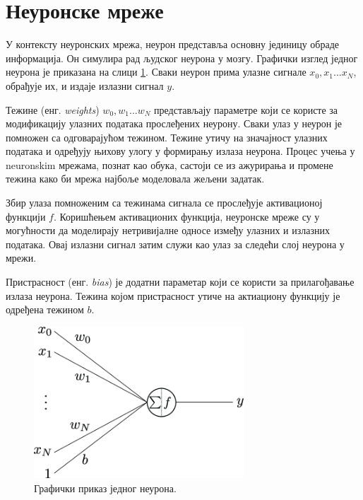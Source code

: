 \documentclass[a4paper, 12pt, master, utf8]{etf}
\begin{document}
\section{Неуронске мреже}
\label{sec:23}

У контексту неуронских мрежа, неурон представља основну јединицу обраде информација. \cite{noauthor_artificial_20233} 
Он симулира рад људског неурона у мозгу. Графички изглед једног неурона је приказана на слици \ref{fig:neuron}. Сваки неурон прима улазне сигнале $x_0, x_1 ... x_N$, обрађује их, и издаје излазни сигнал $y$. 
\newline

Тежине (енг. \textit{weights}) $w_0, w_1 ... w_N$ представљају параметре који се користе за модификацију улазних података прослеђених неурону. Сваки улаз у неурон је помножен са одговарајућом тежином. Тежине утичу на значајност улазних података и одређују њихову улогу у 
формирању излаза неурона. Процес учења у neuronskim мрежама, познат као обука, састоји се из ажурирања и промене тежина како би мрежа најбоље моделовала жељени задатак.
\newline

Збир улаза помноженим са тежинама сигнала се прослеђује активационој функцији $f$. 
Коришћењем активационих функција, неуронске мреже су у могућности да моделирају нетривијалне односе између улазних и излазних података. Овај излазни сигнал затим служи као улаз за следећи слој неурона у мрежи.
\newline

Пристрасност (енг. \textit{bias}) је додатни параметар који се користи за прилагођавање излаза неурона. Тежина којом пристрасност утиче на актиациону функцију је одређена тежином $b$.
\newline

\begin{figure}[h]
    \centering
    \includegraphics[width=0.7\textwidth]{images/neuron.png}
    \caption{Графички приказ једног неурона. \cite{ioannou_structural_2017}}
    \label{fig:neuron}
\end{figure}
\end{document}
